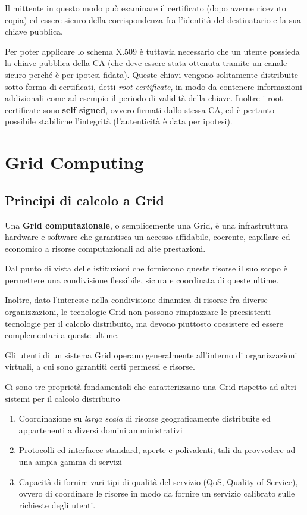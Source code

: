 \documentclass[italian,]{article}
\providecommand{\tightlist}{%
  \setlength{\itemsep}{0pt}\setlength{\parskip}{0pt}}
\begin{document}
Il mittente in questo modo può esaminare il certificato (dopo averne
ricevuto copia) ed essere sicuro della corrispondenza fra l'identità del
destinatario e la sua chiave pubblica.

Per poter applicare lo schema X.509 è tuttavia necessario che un utente
possieda la chiave pubblica della CA (che deve essere stata ottenuta
tramite un canale sicuro perché è per ipotesi fidata). Queste chiavi
vengono solitamente distribuite sotto forma di certificati, detti
\emph{root certificate}, in modo da contenere informazioni addizionali
come ad esempio il periodo di validità della chiave. Inoltre i root
certificate sono \textbf{self signed}, ovvero firmati dallo stessa CA,
ed è pertanto possibile stabilirne l'integrità (l'autenticità è data per
ipotesi).

\section{Grid Computing}\label{grid-computing}

\subsection{Principi di calcolo a
Grid}\label{principi-di-calcolo-a-grid}

Una \textbf{Grid computazionale}, o semplicemente una Grid, è una
infrastruttura hardware e software che garantisca un accesso affidabile,
coerente, capillare ed economico a risorse computazionali ad alte
prestazioni.

Dal punto di vista delle istituzioni che forniscono queste risorse il
suo scopo è permettere una condivisione flessibile, sicura e coordinata
di queste ultime.

Inoltre, dato l'interesse nella condivisione dinamica di risorse fra
diverse organizzazioni, le tecnologie Grid non possono rimpiazzare le
preesistenti tecnologie per il calcolo distribuito, ma devono piuttosto
coesistere ed essere complementari a queste ultime.

Gli utenti di un sistema Grid operano generalmente all'interno di
organizzazioni virtuali, a cui sono garantiti certi permessi e risorse.

Ci sono tre proprietà fondamentali che caratterizzano una Grid rispetto
ad altri sistemi per il calcolo distribuito

\begin{enumerate}
\def\labelenumi{\arabic{enumi}.}
\tightlist
\item
  Coordinazione su \emph{larga scala} di risorse geograficamente
  distribuite ed appartenenti a diversi domini amministrativi
\item
  Protocolli ed interfacce standard, aperte e polivalenti, tali da
  provvedere ad una ampia gamma di servizi
\item
  Capacità di fornire vari tipi di qualità del servizio (QoS, Quality of
  Service), ovvero di coordinare le risorse in modo da fornire un
  servizio calibrato sulle richieste degli utenti.
\end{enumerate}
\end{document}
